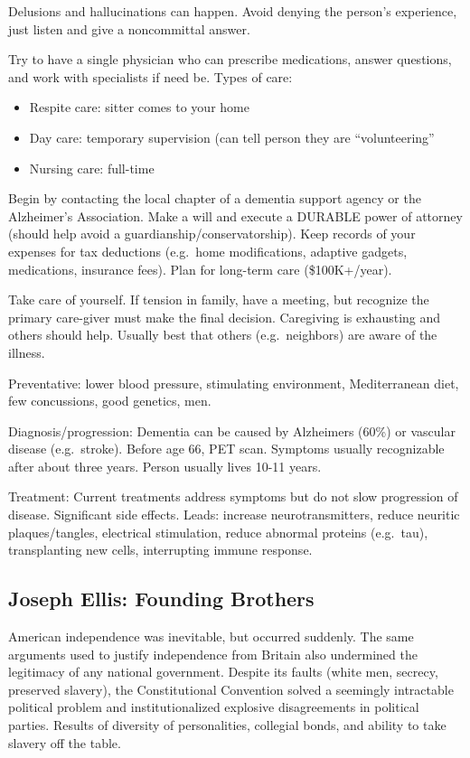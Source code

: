 \documentclass[
]{article}
\begin{document}
Delusions and hallucinations can happen. Avoid denying the person's
experience, just listen and give a noncommittal answer.

Try to have a single physician who can prescribe medications, answer
questions, and work with specialists if need be. Types of care:

\begin{itemize}
\item
  Respite care: sitter comes to your home
\item
  Day care: temporary supervision (can tell person they are
  ``volunteering''
\item
  Nursing care: full-time
\end{itemize}

Begin by contacting the local chapter of a dementia support agency or
the Alzheimer's Association. Make a will and execute a DURABLE power of
attorney (should help avoid a guardianship/conservatorship). Keep
records of your expenses for tax deductions (e.g.~home modifications,
adaptive gadgets, medications, insurance fees). Plan for long-term care
(\$100K+/year).

Take care of yourself. If tension in family, have a meeting, but
recognize the primary care-giver must make the final decision.
Caregiving is exhausting and others should help. Usually best that
others (e.g.~neighbors) are aware of the illness.

Preventative: lower blood pressure, stimulating environment,
Mediterranean diet, few concussions, good genetics, men.

Diagnosis/progression: Dementia can be caused by Alzheimers (60\%) or
vascular disease (e.g.~stroke). Before age 66, PET scan. Symptoms
usually recognizable after about three years. Person usually lives 10-11
years.

Treatment: Current treatments address symptoms but do not slow
progression of disease. Significant side effects. Leads: increase
neurotransmitters, reduce neuritic plaques/tangles, electrical
stimulation, reduce abnormal proteins (e.g.~tau), transplanting new
cells, interrupting immune response.

\hypertarget{joseph-ellis-founding-brothers}{%
\subsection{Joseph Ellis: Founding
Brothers}\label{joseph-ellis-founding-brothers}}

American independence was inevitable, but occurred suddenly. The same
arguments used to justify independence from Britain also undermined the
legitimacy of any national government. Despite its faults (white men,
secrecy, preserved slavery), the Constitutional Convention solved a
seemingly intractable political problem and institutionalized explosive
disagreements in political parties. Results of diversity of
personalities, collegial bonds, and ability to take slavery off the
table.
\end{document}
